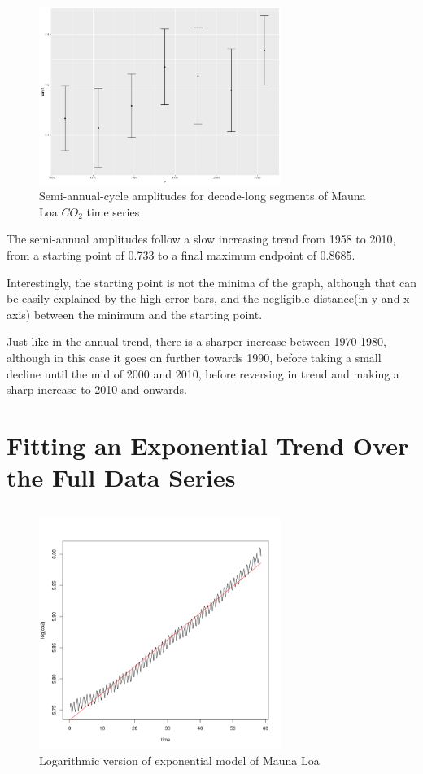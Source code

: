 \documentclass[paper=a4, fontsize=11pt]{scrartcl}
\numberwithin{equation}{section} %
\numberwithin{figure}{section} %
\numberwithin{table}{section} %
\begin{document}
\pagebreak
\subsection{}
\begin{figure}[htp]
	\centering
	\includegraphics[width=0.7\textwidth, clip]{q3c.png} 
	\caption{Semi-annual-cycle amplitudes for decade-long segments of Mauna Loa $CO_2$ time series}
\end{figure}
The semi-annual amplitudes follow a slow increasing trend from 1958 to 2010, from a starting point of 0.733 to a final maximum endpoint of 0.8685. 

Interestingly, the starting point is not the minima of the graph, although that can be easily explained by the high error bars, and the negligible distance(in y and x axis) between the minimum and the starting point.

Just like in the annual trend, there is a sharper increase between 1970-1980, although in this case it goes on further towards 1990, before taking a small decline until the mid of 2000 and 2010, before reversing in trend and making a sharp increase to 2010 and onwards.

\pagebreak
\section{Fitting an Exponential Trend Over the Full Data Series}
\subsection{}
\begin{figure}[htp]
	\centering
	\includegraphics[width=0.7\textwidth, clip]{q4a.png} 
	\caption{Logarithmic version of exponential model of Mauna Loa}
\end{figure}
\pagebreak
\end{document}
